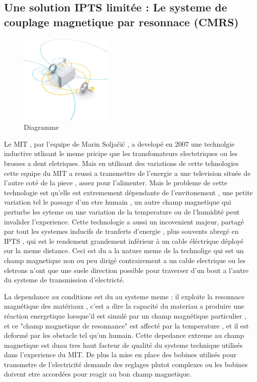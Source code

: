 \documentclass[11pt]{report}
\begin{document}
\subsection{Une solution IPTS limitée : Le systeme de couplage magnetique par resonnace (CMRS)}
\begin{figure}
  \begin{center}
  \includegraphics[width=0.4\textwidth]{WTdiagram}
  \end{center}
\caption{Diagramme}
\end{figure}Le MIT , par l'equipe de Marin Soljačić , a developé en 2007 une technolgie inductive utlisant le meme pricipe que les transfomateurs electetriques ou les brosses a dent eletriques. Mais en utilisant des variations de cette tehnologies cette equipe du MIT a reussi a transmettre de l'energie a une television située de l'autre coté de la piece , assez pour l'alimenter. Mais le probleme de cette technologie est qu'elle est extremement dépendante de l'envitonement , une petite variation tel le passage d'un etre humain , un autre champ magnetique qui perturbe les syteme ou une variation de la temperature ou de l'humidité peut invalider l'experience. Cette technologie a aussi un incovenient majeur, partagé par tout les systemes inducifs de tranferts d'energie , plus souvents abregé en IPTS , qui est le rendement grandement inférieur à un cable éléctrique déployé sur la meme distance. Ceci est du a la nature meme de la technolige qui est un champ magnetique non ou peu dirigé contrairement a un cable electrique ou les eletrons n'ont que une suele direction possible pour traverser d'un bout a l'autre du systeme de transmission d'electricté.

	La dependance au conditions est du au systeme meme : il exploite la resonnace magnétique des matériaux , c'est a dire la capacité du materiau a produire une réaction energetique lorsque'il est simulé par un champ magnétique particulier , et ce "champ magnetique de resonnance" est affecté par la temperature , et il est deformé par les obstacle tel qu'un humain. Cette depedance extreme au champ magnetique est duau tres haut facteur de qualité du systeme technique utilisés dans l'experience du MIT. De plus la mise en place des bobines utilisés pour transmetre de l'electricité demande des reglages plutot complexes ou les bobines doivent etre accordées pour reagir au bon champ magnetique.
	
\end{document}
